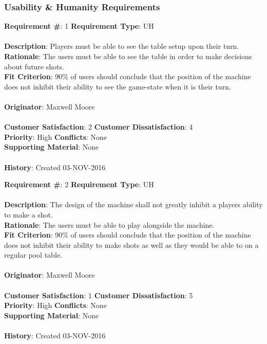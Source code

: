 \documentclass[titlepage]{article}
\begin{document}
\subsubsection{Usability \& Humanity Requirements}
\begin{framed}
	\noindent\textbf{Requirement \#}: 1 \hfill \textbf{Requirement Type}: UH \hfill\\\\
	\noindent\textbf{Description}: Players must be able to see the table setup upon their turn.\\
	\textbf{Rationale}: The users must be able to see the table in order to make decisions about future shots.\\
	\textbf{Fit Criterion}: 90\% of users should conclude that the position of the machine does not inhibit their ability to see the game-state when it is their turn.\\\\
	\textbf{Originator}: Maxwell Moore\\\\
	\noindent\textbf{Customer Satisfaction}: 2 \hfill 	\textbf{Customer Dissatisfaction}: 4 \hfill\\
	\textbf{Priority}: High \hfill \textbf{Conflicts}: None \hfill\\
	\textbf{Supporting Material}: None\\\\
	\noindent\textbf{History}: Created 03-NOV-2016
\end{framed}

\newpage
\begin{framed}
	\noindent\textbf{Requirement \#}: 2 \hfill \textbf{Requirement Type}: UH \hfill\\\\
	\noindent\textbf{Description}: The design of the machine shall not greatly inhibit a players ability to make a shot.\\
	\textbf{Rationale}: The users must be able to play alongside the machine.\\
	\textbf{Fit Criterion}: 90\% of users should conclude that the position of the machine does not inhibit their ability to make shots as well as they would be able to on a regular pool table.\\\\
	\textbf{Originator}: Maxwell Moore\\\\
	\noindent\textbf{Customer Satisfaction}: 1 \hfill 	\textbf{Customer Dissatisfaction}: 5 \hfill\\
	\textbf{Priority}: High \hfill \textbf{Conflicts}: None \hfill\\
	\textbf{Supporting Material}: None\\\\
	\noindent\textbf{History}: Created 03-NOV-2016
\end{framed}
\end{document}
